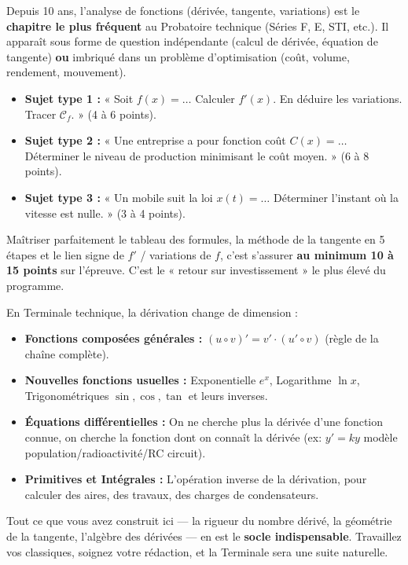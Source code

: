 \documentclass[11pt]{article}
\newcounter{popsec}
\newcounter{popsub}
\newcommand{\courssub}[1]{%
  \stepcounter{popsub}%
  \par\vspace{9pt}\noindent{\popxbold\fontsize{11.5}{13}\selectfont\color{popink}{\color{poporange}\thepopsec.\thepopsub}\hspace{6pt}#1}\par\nopagebreak\vspace{4pt}
}
\begin{document}
\begin{savaistu}
Depuis 10 ans, l'analyse de fonctions (dérivée, tangente, variations) est le \textbf{chapitre le plus fréquent} au Probatoire technique (Séries F, E, STI, etc.). Il apparaît sous forme de question indépendante (calcul de dérivée, équation de tangente) \textbf{ou} imbriqué dans un problème d'optimisation (coût, volume, rendement, mouvement).
\begin{itemize}
    \item \textbf{Sujet type 1 :} « Soit $f(x)=\dots$ Calculer $f'(x)$. En déduire les variations. Tracer $\mathcal{C}_f$. » (4 à 6 points).
    \item \textbf{Sujet type 2 :} « Une entreprise a pour fonction coût $C(x)=\dots$ Déterminer le niveau de production minimisant le coût moyen. » (6 à 8 points).
    \item \textbf{Sujet type 3 :} « Un mobile suit la loi $x(t)=\dots$ Déterminer l'instant où la vitesse est nulle. » (3 à 4 points).
\end{itemize}
Maîtriser parfaitement le tableau des formules, la méthode de la tangente en 5 étapes et le lien signe de $f'$ / variations de $f$, c'est s'assurer \textbf{au minimum 10 à 15 points} sur l'épreuve. C'est le « retour sur investissement » le plus élevé du programme.
\end{savaistu}

\courssub{Vers la Terminale : ce qui vous attend}

En Terminale technique, la dérivation change de dimension :
\begin{itemize}
    \item \textbf{Fonctions composées générales :} $(u \circ v)' = v' \cdot (u' \circ v)$ (règle de la chaîne complète).
    \item \textbf{Nouvelles fonctions usuelles :} Exponentielle $e^x$, Logarithme $\ln x$, Trigonométriques $\sin, \cos, \tan$ et leurs inverses.
    \item \textbf{Équations différentielles :} On ne cherche plus la dérivée d'une fonction connue, on cherche la fonction dont on connaît la dérivée (ex: $y' = ky$ modèle population/radioactivité/RC circuit).
    \item \textbf{Primitives et Intégrales :} L'opération inverse de la dérivation, pour calculer des aires, des travaux, des charges de condensateurs.
\end{itemize}
Tout ce que vous avez construit ici — la rigueur du nombre dérivé, la géométrie de la tangente, l'algèbre des dérivées — en est le \textbf{socle indispensable}. Travaillez vos classiques, soignez votre rédaction, et la Terminale sera une suite naturelle.
\end{document}
